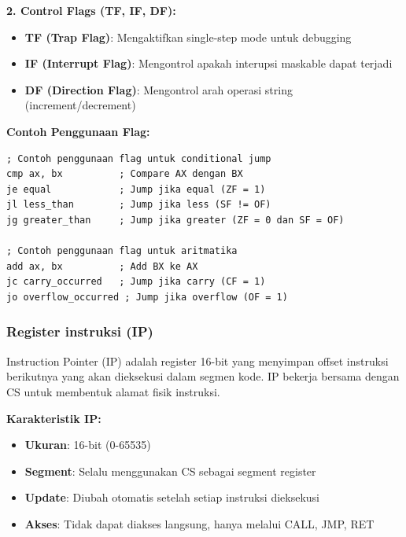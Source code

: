 \textbf{2. Control Flags (TF, IF, DF):}
\begin{itemize}
    \item \textbf{TF (Trap Flag)}: Mengaktifkan single-step mode untuk debugging
    \item \textbf{IF (Interrupt Flag)}: Mengontrol apakah interupsi maskable dapat terjadi
    \item \textbf{DF (Direction Flag)}: Mengontrol arah operasi string (increment/decrement)
\end{itemize}

\textbf{Contoh Penggunaan Flag:}
\begin{lstlisting}[language={[x86masm]Assembler}, caption=Penggunaan Flag untuk Conditional Jump, label=lst:flag-usage]
; Contoh penggunaan flag untuk conditional jump
cmp ax, bx          ; Compare AX dengan BX
je equal            ; Jump jika equal (ZF = 1)
jl less_than        ; Jump jika less (SF != OF)
jg greater_than     ; Jump jika greater (ZF = 0 dan SF = OF)

; Contoh penggunaan flag untuk aritmatika
add ax, bx          ; Add BX ke AX
jc carry_occurred   ; Jump jika carry (CF = 1)
jo overflow_occurred ; Jump jika overflow (OF = 1)
\end{lstlisting}

\subsubsection{Register instruksi (IP)}
Instruction Pointer (IP) adalah register 16-bit yang menyimpan offset instruksi berikutnya yang akan dieksekusi dalam segmen kode. IP bekerja bersama dengan CS untuk membentuk alamat fisik instruksi.

\textbf{Karakteristik IP:}
\begin{itemize}
    \item \textbf{Ukuran}: 16-bit (0-65535)
    \item \textbf{Segment}: Selalu menggunakan CS sebagai segment register
    \item \textbf{Update}: Diubah otomatis setelah setiap instruksi dieksekusi
    \item \textbf{Akses}: Tidak dapat diakses langsung, hanya melalui CALL, JMP, RET
\end{itemize}

